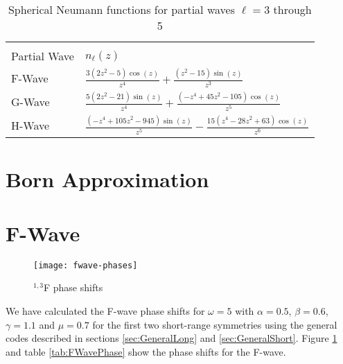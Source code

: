 \documentclass[Dissertation.tex]{subfiles}
\begin{document}
{
\renewcommand{\arraystretch}{1.5}
\begin{table}[H]
\centering
\begin{tabular}{l l}
\toprule\\[-1.2cm]
Partial Wave & $n_\ell(z)$ \\
\midrule
F-Wave & $\frac{3 \left(2 z^2-5\right) \cos (z)}{z^4}+\frac{\left(z^2-15\right) \sin (z)}{z^3}$ \\
G-Wave & $\frac{5 \left(2 z^2-21\right) \sin (z)}{z^4}+\frac{\left(-z^4+45 z^2-105\right) \cos (z)}{z^5}$ \\
H-Wave & $\frac{\left(-z^4+105 z^2-945\right) \sin (z)}{z^5}-\frac{15 \left(z^4-28 z^2+63\right) \cos (z)}{z^6}$ \\
\bottomrule
\end{tabular}
\caption{Spherical Neumann functions for partial waves $\ell = 3$ through 5}
\label{tab:SphNeum}
\end{table}
}


\section{Born Approximation}
\label{sec:Born}


\section{F-Wave}
\label{sec:FWave}

\begin{figure}[H]
	\centering
	\texttt{[image: fwave-phases]}
	\caption{$^{1,3}$F phase shifts}
	\label{fig:FWavePhase}
\end{figure}

We have calculated the F-wave phase shifts for $\omega = 5$ with $\alpha = 0.5$, $\beta = 0.6$, $\gamma = 1.1$ and $\mu = 0.7$ for the first two short-range symmetries using the general codes described in sections \ref{sec:GeneralLong} and \ref{sec:GeneralShort}. Figure \ref{fig:FWavePhase} and table \ref{tab:FWavePhase} show the phase shifts for the F-wave.
\end{document}
